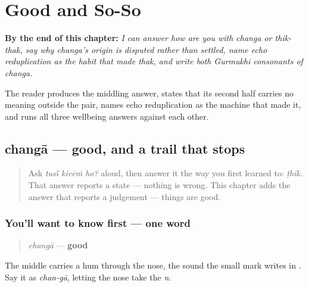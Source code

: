 
\chapter{Good and So-So}
\label{ch:pa-good-and-soso}

\begin{chapteropening}
\textbf{By the end of this chapter:} \emph{I can answer how are you with changa or thik-thak, say why changa's origin is disputed rather than settled, name echo reduplication as the habit that made thak, and write both Gurmukhi consonants of changa.}

The reader produces the middling answer, states that its second half carries no meaning outside the pair, names echo reduplication as the machine that made it, and runs all three wellbeing answers against each other.
\end{chapteropening}

\section[\texorpdfstring{\pa{ਚੰਗਾ} (changā)}{ਚੰਗਾ (changā)}]{changā — good, and a trail that stops}

\label{lesson:PA-C32-changa}



\begin{quote}
Ask \emph{tusī̃ kivēṁ ho?} aloud, then answer it the way you first learned to: \emph{ṭhīk}. That answer reports a state — nothing is wrong. This chapter adds the answer that reports a judgement — things are good.
\end{quote}

\subsection*{You'll want to know first — one word}
\begin{quote}
\emph{changā} — \textbf{good}
\end{quote}

The middle carries a hum through the nose, the sound the small mark \textbf{} writes in \textbf{}. Say it as \emph{chan-gā}, letting the nose take the \emph{n}.


